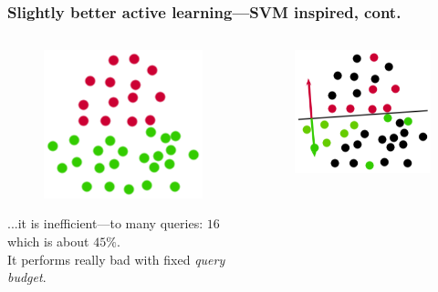 \documentclass{beamer}
\begin{document}
  \begin{frame}
    \frametitle{Slightly better active learning---SVM inspired, cont.}
    \begin{columns}
      \begin{column}{5cm}
        \begin{figure}
          \includegraphics[scale=.25]{graphics/presentation/al1a} 
        \end{figure}
        ...it is inefficient---to many queries: $16$ which is about $45\%$.\\

        It performs really bad with fixed \emph{query budget}.
      \end{column}
      \begin{column}{5cm}
        \begin{figure}
          \includegraphics[scale=.5]{graphics/presentation/al1d} 
        \end{figure}
      \end{column}
    \end{columns}
  \end{frame}
\end{document}
